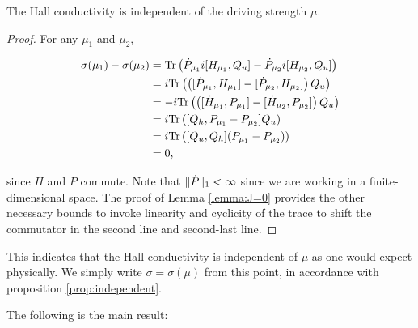 \documentclass[12pt, letterpaper]{article}
\begin{document}
\begin{proposition}
The Hall conductivity is independent of the driving strength $\mu$.
\label{prop:independent}
\end{proposition}
\begin{proof}


For any $\mu_1$ and $\mu_2$,



\[\begin{aligned}
\sigma(\mu_1) - \sigma(\mu_2) &= \text{Tr}\left( \dot{P}_{\mu_1} i[H_{\mu_1}, Q_u] - \dot{P}_{\mu_2}i[H_{\mu_2},Q_u]\right)\\
&= i\text{Tr}\left(\left([\dot{P}_{\mu_1}, H_{\mu_1}] - [\dot{P}_{\mu_2}, H_{\mu_2}]\right)Q_u\right)\\
&= - i\text{Tr}\left(\left([\dot{H}_{\mu_1}, P_{\mu_1}] - [\dot{H}_{\mu_2}, P_{\mu_2}]\right)Q_u\right)\\
&= i\text{Tr}\left( [Q_h, P_{\mu_1} - P_{\mu_2}]Q_u \right)\\
&= i\text{Tr}\left( [Q_u,Q_h]( P_{\mu_1} - P_{\mu_2})\right)\\
&= 0,
\end{aligned}\]

since $H$ and $P$ commute. Note that $\lVert \dot{P} \rVert_1<\infty$ since we are working in a finite-dimensional space. The proof of Lemma \ref{lemma:J=0} provides the other necessary bounds to invoke linearity and cyclicity of the trace to shift the commutator in the second line and second-last line.
\end{proof}

This indicates that the Hall conductivity is independent of $\mu$ as one would expect physically. We simply write $\sigma=\sigma(\mu)$ from this point, in accordance with proposition \ref{prop:independent}. 

The following is the main result:
\end{document}
